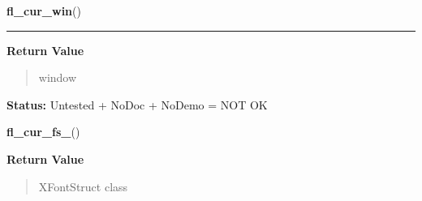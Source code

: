     \label{xformslib:library:fl_cur_win_}

    \vspace{0.5ex}

\hspace{.8\funcindent}\begin{boxedminipage}{\funcwidth}

    \raggedright \textbf{fl\_cur\_win}()

    \vspace{-1.5ex}

    \rule{\textwidth}{0.5\fboxrule}
\setlength{\parskip}{2ex}
\setlength{\parskip}{1ex}
      \textbf{Return Value}
    \vspace{-1ex}

      \begin{quote}
      window

      \end{quote}

\textbf{Status:} Untested + NoDoc + NoDemo = NOT OK



    \end{boxedminipage}

    \label{xformslib:library:fl_cur_fs_}

    \vspace{0.5ex}

\hspace{.8\funcindent}\begin{boxedminipage}{\funcwidth}

    \raggedright \textbf{fl\_cur\_fs\_}()

\setlength{\parskip}{2ex}
\setlength{\parskip}{1ex}
      \textbf{Return Value}
    \vspace{-1ex}

      \begin{quote}
      XFontStruct class

      \end{quote}

    \end{boxedminipage}

    \label{xformslib:library:fl_cur_fs_}

